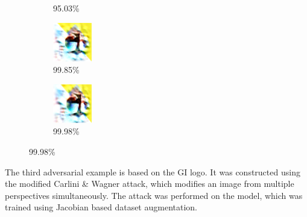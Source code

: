\begin{enumerate}
\begin{figure}[!h]
\begin{subfigure}{.19\linewidth}
  \caption{95.03\%}
\end{subfigure}
\begin{subfigure}{.19\linewidth}
  \centering
  \includegraphics[width=0.7\linewidth]{imgs/robust_10/3_r}
  \caption{99.85\%}
\end{subfigure}
\begin{subfigure}{.19\linewidth}
  \centering
  \includegraphics[width=0.7\linewidth]{imgs/robust_10/4_rr}
  \caption{99.98\%}
\end{subfigure}
\end{figure}

The third adversarial example is based on the GI logo.
It was constructed using the modified Carlini \& Wagner attack,
which modifies an image from multiple perspectives simultaneously.
The attack was performed on the model, which was trained using Jacobian based dataset augmentation.


\end{enumerate}
